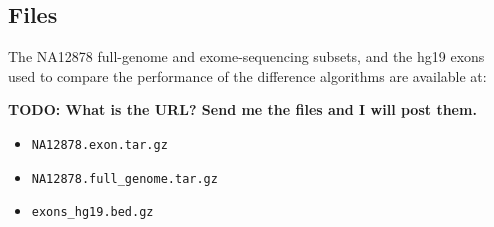 \subsection{Files}

The NA12878 full-genome and exome-sequencing subsets, and the hg19 exons used to
compare the performance of the difference algorithms are available at:

\textbf{TODO: What is the URL?  Send me the files and I will post them.}

\begin{itemize}
	\item {\tt NA12878.exon.tar.gz}
	\item {\tt NA12878.full\_genome.tar.gz}
	\item {\tt exons\_hg19.bed.gz}
\end{itemize}

